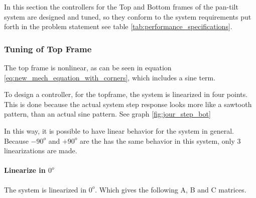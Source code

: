 \documentclass[../../../Main]{subfiles}
\begin{document}
\label{sec:PI}
In this section the controllers for the Top and Bottom frames of the pan-tilt system are designed and tuned, so they conform to the system requirements put forth in the problem statement see table \ref{tab:performance_specifications}.

\subsubsection{Tuning of Top Frame}
\label{sec:top_frame_tuning}
The top frame is nonlinear, as can be seen in equation \eqref{eq:new_mech_equation_with_corners}, which includes a sine term.

To design a controller, for the topframe, the system is linearized in four points. This is done because the actual system step response looks more like a sawtooth pattern, than an actual sine pattern. See graph \ref{fig:jour_step_bot}

In this way, it is possible to have linear behavior for the system in general.
Because $-90^o$ and  $+90^o$ are the has the same behavior in this system, only 3 linearizations are made.

\paragraph{Linearize in $0^o$}
\label{sec:linearize}
The system is linearized in $0^o$. Which gives the following A, B and C matrices.
\end{document}
